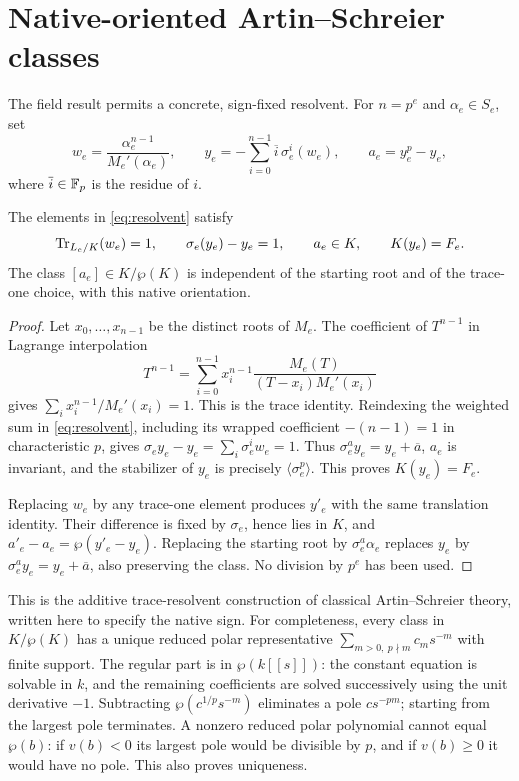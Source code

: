 \section{Native-oriented Artin--Schreier classes}\label{sec:as}

The field result permits a concrete, sign-fixed resolvent.
For \(n=p^e\) and \(\alpha_e\in S_e\), set
\begin{equation}\label{eq:resolvent}
 w_e=\frac{\alpha_e^{n-1}}{M_e'(\alpha_e)},\qquad
 y_e=-\sum_{i=0}^{n-1}\overline i\,\sigma_e^i(w_e),\qquad
 a_e=y_e^p-y_e ,
\end{equation}
where \(\overline i\in\mathbb F_p\) is the residue of \(i\).

\begin{lemma}\label{lem:resolvent}
The elements in \eqref{eq:resolvent} satisfy
\[
 \operatorname{Tr}_{L_e/K}(w_e)=1,\qquad
 \sigma_e(y_e)-y_e=1,\qquad a_e\in K,\qquad K(y_e)=F_e.
\]
The class \([a_e]\in K/\wp(K)\) is independent of the starting
root and of the trace-one choice, with this native orientation.
\end{lemma}

\begin{proof}
Let \(x_0,\ldots,x_{n-1}\) be the distinct roots of \(M_e\).
The coefficient of \(T^{n-1}\) in Lagrange interpolation
\[
 T^{n-1}=\sum_{i=0}^{n-1}
 x_i^{n-1}\frac{M_e(T)}{(T-x_i)M_e'(x_i)}
\]
gives \(\sum_i x_i^{n-1}/M_e'(x_i)=1\).
This is the trace identity. Reindexing the weighted sum
in \eqref{eq:resolvent}, including its wrapped coefficient
\(-(n-1)=1\) in characteristic \(p\), gives
\(\sigma_e y_e-y_e=\sum_i\sigma_e^i w_e=1\).
Thus \(\sigma_e^a y_e=y_e+\overline a\), \(a_e\) is invariant,
and the stabilizer of \(y_e\) is precisely
\(\langle\sigma_e^p\rangle\). This proves \(K(y_e)=F_e\).

Replacing \(w_e\) by any trace-one element produces \(y'_e\)
with the same translation identity. Their difference is fixed
by \(\sigma_e\), hence lies in \(K\), and
\(a'_e-a_e=\wp(y'_e-y_e)\). Replacing the starting root
by \(\sigma_e^a\alpha_e\) replaces \(y_e\) by
\(\sigma_e^a y_e=y_e+\overline a\), also preserving the class.
No division by \(p^e\) has been used.
\end{proof}

This is the additive trace-resolvent construction of classical
Artin--Schreier theory, written here to specify the native sign.
For completeness, every class in \(K/\wp(K)\) has a unique
reduced polar representative
\(\sum_{m>0,\ p\nmid m}c_ms^{-m}\) with finite support.
The regular part is in \(\wp(k[[s]])\): the constant equation
is solvable in \(k\), and the remaining coefficients are solved
successively using the unit derivative \(-1\).
Subtracting \(\wp(c^{1/p}s^{-m})\) eliminates a pole
\(cs^{-pm}\); starting from the largest pole terminates.
A nonzero reduced polar polynomial cannot equal \(\wp(b)\):
if \(v(b)<0\) its largest pole would be divisible by \(p\),
and if \(v(b)\ge0\) it would have no pole. This also proves
uniqueness.

